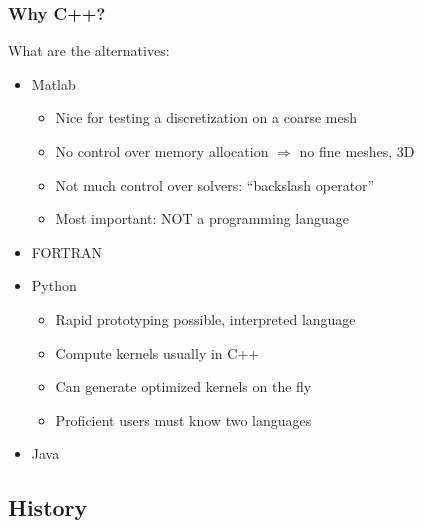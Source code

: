 \begin{frame}
  \frametitle{Why C++?}
  What are the alternatives:
  \begin{itemize}
  \item<+-> Matlab
    \begin{itemize}
    \item Nice for testing a discretization on a coarse mesh
    \item No control over memory allocation $\Rightarrow$ no fine meshes, 3D
    \item Not much control over solvers: ``backslash operator''
    \item Most important: NOT a programming language
    \end{itemize}
  \item<+-> FORTRAN
  \item<+-> Python
    \begin{itemize}
    \item Rapid prototyping possible, interpreted language
    \item Compute kernels usually in C++
    \item Can generate optimized kernels on the fly
    \item Proficient users must know two languages
    \end{itemize}
  \item<+-> Java
  \end{itemize}
\end{frame}

\subsection{History}

